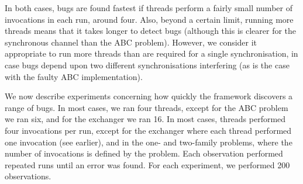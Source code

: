 
In both cases, bugs are found fastest if threads perform a fairly small number
of invocations in each run, around four.  Also, beyond a certain limit,
running more threads means that it takes longer to detect bugs (although this
is clearer for the synchronous channel than the ABC problem).  However, we
consider it appropriate to run more threads than are required for a single
synchronisation, in case bugs depend upon two different synchronisations
interfering (as is the case with the faulty ABC implementation).




We now describe experiments concerning how quickly the framework discovers a
range of bugs.  In most cases, we ran four threads, except for the ABC problem
we ran six, and for the exchanger we ran 16.  In most cases, threads performed
four invocations per run, except for the exchanger where each thread performed
one invocation (see earlier), and in the one- and two-family problems, where
the number of invocations is defined by the problem.  Each observation
performed repeated runs until an error was found.  For each experiment, we
performed 200 observations.



